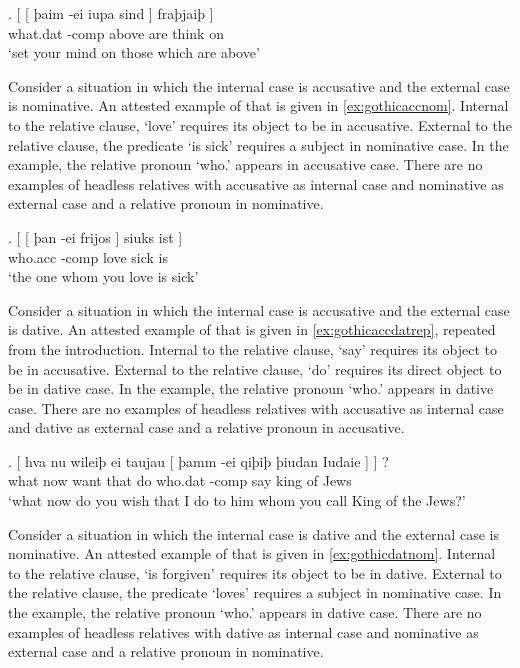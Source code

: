 \exg. [ [ þaim -ei iupa sind ] fraþjaiþ ]\\
 {} {} what.\ac{dat} -\ac{comp} above are \scsub{[nom]} {think on} \scsub{[dat]}\\
 `set your mind on those which are above' \label{ex:gothicnomdat}

Consider a situation in which the internal case is accusative and the external case is nominative. An attested example of that is given in  \ref{ex:gothicaccnom}. Internal to the relative clause,  `love' requires its object to be in accusative. External to the relative clause, the predicate  `is sick' requires a subject in nominative case. In the example, the relative pronoun  `who.' appears in accusative case. There are no examples of headless relatives with accusative as internal case and nominative as external case and a relative pronoun in nominative.

\exg. [ [ þan -ei frijos ] siuks ist ]\\
 {} {} who.\ac{acc} -\ac{comp} love \scsub{[acc]} sick is \scsub{[nom]}\\
 `the one whom you love is sick' \label{ex:gothicaccnom}

Consider a situation in which the internal case is accusative and the external case is dative. An attested example of that is given in  \ref{ex:gothicaccdatrep}, repeated from the introduction. Internal to the relative clause,  `say' requires its object to be in accusative. External to the relative clause,  `do' requires its direct object to be in dative case. In the example, the relative pronoun  `who.' appears in dative case. There are no examples of headless relatives with accusative as internal case and dative as external case and a relative pronoun in accusative.

\exg. [ hva nu wileiþ ei taujau [ þamm -ei qiþiþ þiudan Iudaie ] ] ?\\
 {} what now want that do {} who.\ac{dat} -\ac{comp} say king {of Jews} \scsub{[acc]} \scsub{[dat]}\\
 `what now do you wish that I do to him whom you call King of the Jews?' \label{ex:gothicaccdatrep}

Consider a situation in which the internal case is dative and the external case is nominative. An attested example of that is given in  \ref{ex:gothicdatnom}. Internal to the relative clause,  `is forgiven' requires its object to be in dative. External to the relative clause, the predicate  `loves' requires a subject in nominative case. In the example, the relative pronoun  `who.' appears in dative case. There are no examples of headless relatives with dative as internal case and nominative as external case and a relative pronoun in nominative.

